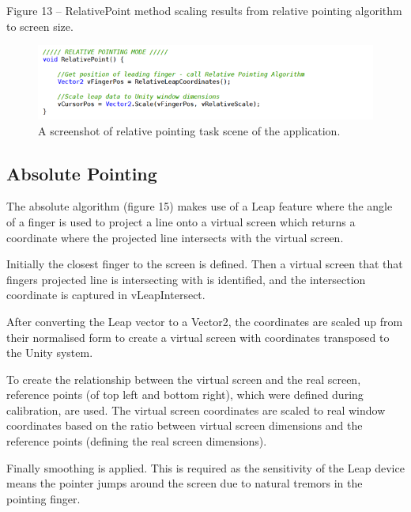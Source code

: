\documentclass[titlepage]{article}
\begin{document}
Figure 13 – RelativePoint method scaling results from relative pointing algorithm to screen size.
\begin{figure}[!h]
    \centering
    \includegraphics[width=7.0in]{Figure_12}
    \caption{A screenshot of relative pointing task scene of the application.}
\end{figure}


\subsection{Absolute Pointing}
The absolute algorithm (figure 15) makes use of a Leap feature where the angle of a finger is used to project a line onto a virtual screen which returns a coordinate where the projected line intersects with the virtual screen.
 
Initially the closest finger to the screen is defined. Then a virtual screen that that fingers projected line is intersecting with is identified, and the intersection coordinate is captured in vLeapIntersect.
 
After converting the Leap vector to a Vector2, the coordinates are scaled up from their normalised form to create a virtual screen with coordinates transposed to the Unity system.
 
To create the relationship between the virtual screen and the real screen, reference points (of top left and bottom right), which were defined during calibration, are used. The virtual screen coordinates are scaled to real window coordinates based on the ratio between virtual screen dimensions and the reference points (defining the real screen dimensions).
 
Finally smoothing is applied. This is required as the sensitivity of the Leap device means the pointer jumps around the screen due to natural tremors in the pointing finger.
\end{document}
